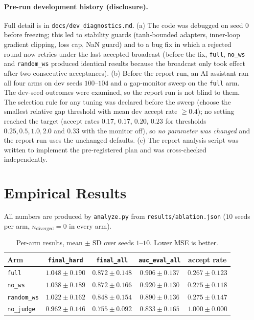 \documentclass[11pt]{article}
\newcommand{\fh}{\texttt{final\_hard}}
\newcommand{\fa}{\texttt{final\_all}}
\newcommand{\auc}{\texttt{auc\_eval\_all}}
\begin{document}
\paragraph{Pre-run development history (disclosure).} Full detail is in \texttt{docs/dev\_diagnostics.md}. (a) The code was debugged on seed $0$ before freezing; this led to stability guards
(tanh-bounded adapters, inner-loop gradient clipping, loss cap, NaN guard) and to a bug fix in which a rejected round now retries under the last accepted broadcast
(before the fix, \texttt{full}, \texttt{no\_ws} and \texttt{random\_ws} produced identical results because the broadcast only took effect after two consecutive acceptances).
(b) Before the report run, an AI assistant ran all four arms on dev seeds $100$--$104$ and a gap-monitor sweep on the \texttt{full} arm.
The dev-seed outcomes were examined, so the report run is not blind to them. The selection rule for any tuning was declared before the sweep
(choose the smallest relative gap threshold with mean dev accept rate $\ge0.4$); no setting reached the target (accept rates $0.17$, $0.17$, $0.20$, $0.23$ for thresholds $0.25,0.5,1.0,2.0$ and $0.33$ with the monitor off),
so \emph{no parameter was changed} and the report run uses the unchanged defaults. (c) The report analysis script was written to implement the pre-registered plan and was cross-checked independently.

\section{Empirical Results}

All numbers are produced by \texttt{analyze.py} from \texttt{results/ablation.json} ($10$ seeds per arm, $n_{\text{diverged}}=0$ in every arm).

\begin{table}[t]
\centering\small
\caption{Per-arm results, mean $\pm$ SD over seeds $1$--$10$. Lower MSE is better.}
\label{tab:main}
\begin{tabular}{lcccc}\toprule
Arm & \fh{} & \fa{} & \auc{} & accept rate\\\midrule
\texttt{full}      & $1.048\pm0.190$ & $0.872\pm0.148$ & $0.906\pm0.137$ & $0.267\pm0.123$\\
\texttt{no\_ws}    & $1.038\pm0.189$ & $0.872\pm0.166$ & $0.920\pm0.130$ & $0.275\pm0.118$\\
\texttt{random\_ws}& $1.022\pm0.162$ & $0.848\pm0.154$ & $0.890\pm0.136$ & $0.275\pm0.147$\\
\texttt{no\_judge} & $0.962\pm0.146$ & $0.755\pm0.092$ & $0.833\pm0.165$ & $1.000\pm0.000$\\\bottomrule
\end{tabular}
\end{table}
\end{document}
